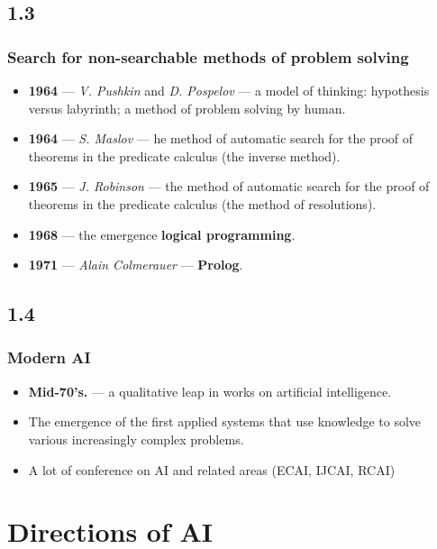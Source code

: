 \documentclass[default]{beamer}
\begin{document}
	\subsection{1.3}
	\begin{frame}
		\frametitle{Search for non-searchable methods of problem solving}
		
		\begin{itemize}
			\item \textbf{1964} --- \textit{V. Pushkin} and \textit{D. Pospelov}  --- a model of thinking: hypothesis versus labyrinth; a method of problem solving by human. 
			\item \textbf{1964} --- \textit{S. Maslov} --- he method of automatic search for the proof of theorems in the predicate calculus (the inverse method).
			\item \textbf{1965} --- \textit{J. Robinson} --- the method of automatic search for the proof of theorems in the predicate calculus (the method of resolutions).
			\item \textbf{1968} --- the emergence \textbf{logical programming}.
			\item \textbf{1971} --- \textit{Alain Colmerauer} --- \textbf{Prolog}.
			
		\end{itemize}
	\end{frame}

	\subsection{1.4}
	\begin{frame}
		\frametitle{Modern AI}
		\Large
		\begin{itemize}
			\item \textbf{Mid-70's.} --- a qualitative leap in works on artificial intelligence.
			\item The emergence of the first applied systems that use knowledge to solve various increasingly complex problems.
			\item A lot of conference on AI and related areas (ECAI, IJCAI, RCAI)
		\end{itemize}
	\end{frame}

	\section{Directions of AI}
\end{document}
